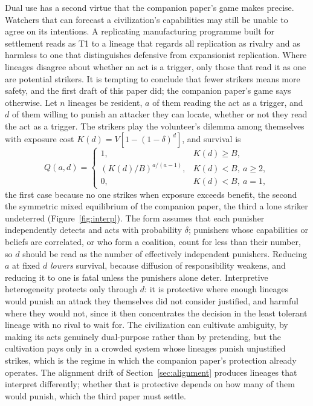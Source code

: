 \documentclass[preprint,12pt]{elsarticle}
\theoremstyle{definition}
\begin{document}
Dual use has a second virtue that the companion paper's game makes precise. Watchers that can forecast a civilization's capabilities may still be unable to agree on its intentions. A replicating manufacturing programme built for settlement reads as T1 to a lineage that regards all replication as rivalry and as harmless to one that distinguishes defensive from expansionist replication. Where lineages disagree about whether an act is a trigger, only those that read it as one are potential strikers. It is tempting to conclude that fewer strikers means more safety, and the first draft of this paper did; the companion paper's game says otherwise. Let $n$ lineages be resident, $a$ of them reading the act as a trigger, and $d$ of them willing to punish an attacker they can locate, whether or not they read the act as a trigger. The strikers play the volunteer's dilemma among themselves with exposure cost $K(d) = V[1 - (1-\delta)^{d}]$, and survival is
\begin{equation}
Q(a,d) =
\begin{cases}
1, & K(d) \geq B,\\
\left(K(d)/B\right)^{a/(a-1)}, & K(d) < B,\ a \geq 2,\\
0, & K(d) < B,\ a = 1,
\end{cases}
\end{equation}
the first case because no one strikes when exposure exceeds benefit, the second the symmetric mixed equilibrium of the companion paper, the third a lone striker undeterred (Figure~\ref{fig:interp}). The form assumes that each punisher independently detects and acts with probability $\delta$; punishers whose capabilities or beliefs are correlated, or who form a coalition, count for less than their number, so $d$ should be read as the number of effectively independent punishers. Reducing $a$ at fixed $d$ \emph{lowers} survival, because diffusion of responsibility weakens, and reducing it to one is fatal unless the punishers alone deter. Interpretive heterogeneity protects only through $d$: it is protective where enough lineages would punish an attack they themselves did not consider justified, and harmful where they would not, since it then concentrates the decision in the least tolerant lineage with no rival to wait for. The civilization can cultivate ambiguity, by making its acts genuinely dual-purpose rather than by pretending, but the cultivation pays only in a crowded system whose lineages punish unjustified strikes, which is the regime in which the companion paper's protection already operates. The alignment drift of Section~\ref{sec:alignment} produces lineages that interpret differently; whether that is protective depends on how many of them would punish, which the third paper must settle.
\end{document}
